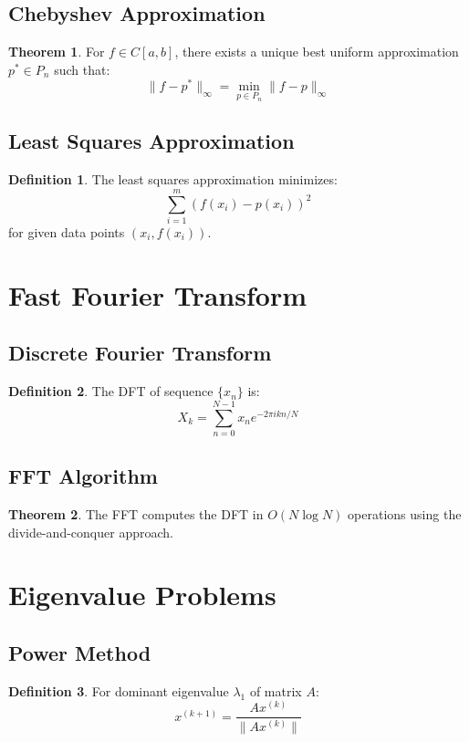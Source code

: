 \documentclass[11pt]{article}
\theoremstyle{definition}
\newtheorem{definition}{Definition}[section]
\newtheorem{theorem}{Theorem}[section]
\begin{document}
\subsection{Chebyshev Approximation}
\begin{theorem}
For $f \in C[a,b]$, there exists a unique best uniform approximation $p^* \in P_n$ such that:
$$\|f - p^*\|_\infty = \min_{p \in P_n} \|f - p\|_\infty$$
\end{theorem}

\subsection{Least Squares Approximation}
\begin{definition}
The least squares approximation minimizes:
$$\sum_{i=1}^m (f(x_i) - p(x_i))^2$$
for given data points $(x_i, f(x_i))$.
\end{definition}

\section{Fast Fourier Transform}

\subsection{Discrete Fourier Transform}
\begin{definition}
The DFT of sequence $\{x_n\}$ is:
$$X_k = \sum_{n=0}^{N-1} x_n e^{-2\pi i kn/N}$$
\end{definition}

\subsection{FFT Algorithm}
\begin{theorem}
The FFT computes the DFT in $O(N \log N)$ operations using the divide-and-conquer approach.
\end{theorem}

\section{Eigenvalue Problems}

\subsection{Power Method}
\begin{definition}
For dominant eigenvalue $\lambda_1$ of matrix $A$:
$$x^{(k+1)} = \frac{Ax^{(k)}}{\|Ax^{(k)}\|}$$
\end{definition}
\end{document}
